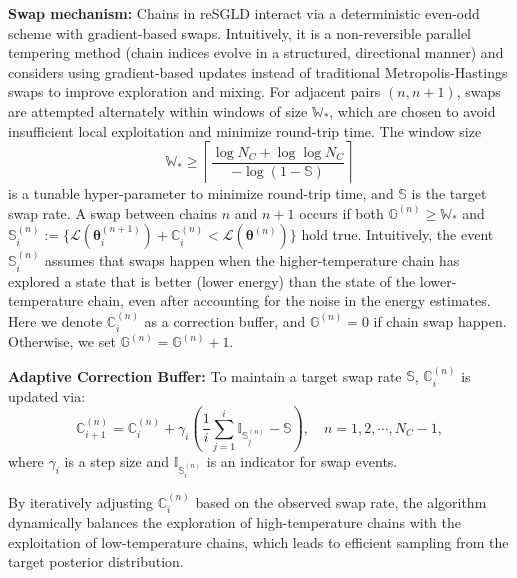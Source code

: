 \textbf{Swap mechanism:}
Chains in reSGLD interact via a deterministic even-odd scheme with gradient-based swaps. Intuitively, it is a non-reversible parallel tempering method (chain indices evolve in a structured, directional manner) and considers using gradient-based updates instead of traditional Metropolis-Hastings swaps to improve exploration and mixing. For adjacent pairs $(n, n+1)$, swaps are attempted alternately within windows of size $\mathbb{W}_*$, which are chosen to avoid insufficient local exploitation and minimize round-trip time. The window size
\begin{equation}\label{eq:window}
    \mathbb W_* \geq \left\lceil \frac{\log N_C + \log \log N_C}{-\log (1-\mathbb{S})} \right\rceil
\end{equation}
is a tunable hyper-parameter to minimize round-trip time, and $\mathbb S$ is the target swap rate. A swap between chains $n$ and $n+1$ occurs if both $\mathbb{G}^{(n)} \geq \mathbb{W}_*$ and $\mathbb S^{(n)}_i:=\{\mathcal{L}({\boldsymbol{\theta}}_i^{(n+1)}) + \mathbb{C}_i^{(n)} < \mathcal{L}({\boldsymbol{\theta}}^{(n)})\}$ hold true. Intuitively, the event $\mathbb S^{(n)}_i$ assumes that swaps happen when the higher-temperature chain has explored a state that is better (lower energy) than the state of the lower-temperature chain, even after accounting for the noise in the energy estimates. Here we denote $\mathbb{C}_i^{(n)}$ as a correction buffer, and $\mathbb G^{(n)} = 0$ if chain swap happen. Otherwise, we set $\mathbb G^{(n)} = \mathbb G^{(n)}+1$.

\textbf{Adaptive Correction Buffer:} To maintain a target swap rate $\mathbb{S}$, $\mathbb{C}_i^{(n)}$ is updated via:  
\begin{equation}\label{eq:buffer_correct}
    \mathbb{C}_{i+1}^{(n)} = \mathbb{C}_{i}^{(n)} + \gamma_i \left( \frac{1}{i} \sum_{j=1}^{i} \mathbb{I}_{\mathbb{S}_j^{(n)}} - \mathbb{S} \right),\quad n=1,2,\cdots,N_C-1,
\end{equation}
where $\gamma_i$ is a step size and $\mathbb{I}_{\mathbb{S}_i^{(n)}}$ is an indicator for swap events. 

By iteratively adjusting $\mathbb{C}_{i}^{(n)}$ based on the observed swap rate, the algorithm dynamically balances the exploration of high-temperature chains with the exploitation of low-temperature chains, which leads to efficient sampling from the target posterior distribution.


